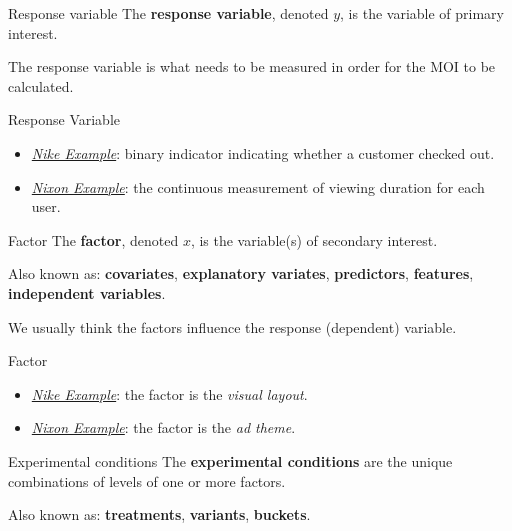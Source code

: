 \begin{Definition}{Response variable}{}
    The \textbf{response variable}, denoted $ y $, is the variable of primary interest.
\end{Definition}
\begin{Remark}{}{}
    The response variable is what needs to be measured in order for the MOI to be calculated.
\end{Remark}
\begin{Example}{Response Variable}{}
    \begin{itemize}
        \item \emph{\hyperref[ex:nike_ex]{Nike Example}}: binary indicator indicating
              whether a customer checked out.
        \item \emph{\hyperref[ex:nixon_ex]{Nixon Example}}: the continuous measurement
              of viewing duration for each user.
    \end{itemize}
\end{Example}
\begin{Definition}{Factor}{}
    The \textbf{factor}, denoted $ x $, is the variable(s) of secondary interest.

    \vspace{2mm}

    Also known as: \textbf{covariates}, \textbf{explanatory variates}, \textbf{predictors},
    \textbf{features}, \textbf{independent variables}.
\end{Definition}
\begin{Remark}{}{}
    We usually think the factors influence the response (dependent) variable.
\end{Remark}
\begin{Example}{Factor}{}
    \begin{itemize}
        \item \emph{\hyperref[ex:nike_ex]{Nike Example}}: the factor is the \emph{visual layout}.
        \item \emph{\hyperref[ex:nixon_ex]{Nixon Example}}: the factor is the \emph{ad theme}.
    \end{itemize}
\end{Example}
\begin{Definition}{Experimental conditions}{}
    The \textbf{experimental conditions} are the unique combinations of levels of one or more
    factors.

    \vspace{2mm}

    Also known as: \textbf{treatments}, \textbf{variants}, \textbf{buckets}.
\end{Definition}
